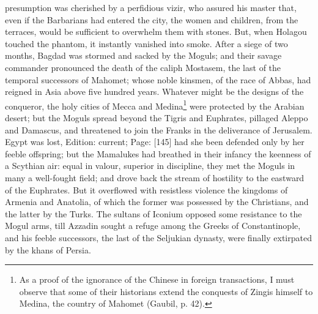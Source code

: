 presumption was cherished by a perfidious vizir, who assured his master that, even if the Barbarians had entered the city, the women and children, from the terraces, would be sufficient to overwhelm them with stones. But, when Holagou touched the phantom, it instantly vanished into smoke. After a siege of two months, Bagdad was stormed and sacked by the Moguls; and their savage commander pronounced the death of the caliph Mostasem, the last of the temporal successors of Mahomet; whose noble kinsmen, of the race of Abbas, had reigned in Asia above five hundred years. Whatever might be the designs of the conqueror, the holy cities of Mecca and Medina\footnote{As a proof of the ignorance of the Chinese in foreign transactions, I must observe that some of their historians extend the conquests of Zingis himself to Medina, the country of Mahomet (Gaubil, p. 42).} were protected by the Arabian desert; but the Moguls spread beyond the Tigris and Euphrates, pillaged Aleppo and Damascus, and threatened to join the Franks in the deliverance of Jerusalem. Egypt was lost, Edition: current; Page: [145] had she been defended only by her feeble offspring; but the Mamalukes had breathed in their infancy the keenness of a Scythian air: equal in valour, superior in discipline, they met the Moguls in many a well-fought field; and drove back the stream of hostility to the eastward of the Euphrates. But it overflowed with resistless violence the kingdoms of Armenia and Anatolia, of which the former was possessed by the Christians, and the latter by the Turks. The sultans of Iconium opposed some resistance to the Mogul arms, till Azzadin sought a refuge among the Greeks of Constantinople, and his feeble successors, the last of the Seljukian dynasty, were finally extirpated by the khans of Persia.

